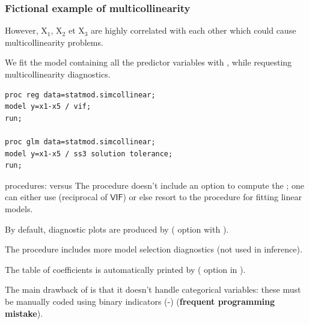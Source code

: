 \documentclass{beamer}
\begin{document}
\begin{frame}[fragile]
\frametitle{Fictional example of multicollinearity}
\bi
\item However, $\mathrm{X}_1$, $\mathrm{X}_2$ et $\mathrm{X}_3$ are highly correlated with each other which could cause multicollinearity problems.
\item We fit the model containing all the predictor variables with , while requesting multicollinearity diagnostics. 
\vp \vp
\begin{tcolorbox}[colback=white,colframe=hecblue,title=\SASlang code to compute variance inflation factor]
\begin{verbatim}
proc reg data=statmod.simcollinear; 
model y=x1-x5 / vif; 
run;

proc glm data=statmod.simcollinear;
model y=x1-x5 / ss3 solution tolerance;
run;
\end{verbatim}
\end{tcolorbox}
\ei
\end{frame}
\begin{frame}{\SASlang procedures:  versus }
The  procedure doesn't include an option to compute the ; one can either use  (reciprocal of $\mathsf{VIF}$) or else resort to the  procedure for fitting linear models. 
\bi \item By default, diagnostic plots are produced by  ( option with ).
\item The  procedure includes more model selection diagnostics (not used in inference).
\item The table of coefficients is automatically printed by  ( option in ).
\item The main drawback of  is that it doesn't handle categorical variables: these must be manually coded using binary indicators (-)  (\textbf{frequent programming mistake}).
\ei
 
\end{frame}
\end{document}
